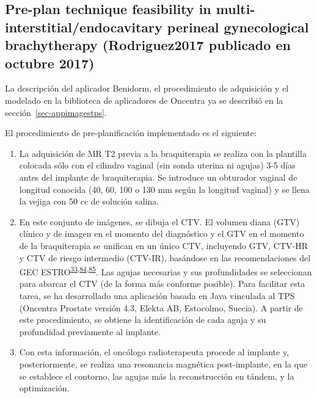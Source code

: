 \documentclass[
  a4paper,
]{scrreprt}
\begin{document}
\hypertarget{pre-plan-technique-feasibility-in-multi-interstitialendocavitary-perineal-gynecological-brachytherapy-rodriguez2017-publicado-en-octubre-2017}{%
\subsection{Pre-plan technique feasibility in
multi-interstitial/endocavitary perineal gynecological brachytherapy
(Rodriguez2017 publicado en octubre
2017)}\label{pre-plan-technique-feasibility-in-multi-interstitialendocavitary-perineal-gynecological-brachytherapy-rodriguez2017-publicado-en-octubre-2017}}

La descripción del aplicador Benidorm, el procedimiento de adquisición y
el modelado en la biblioteca de aplicadores de Oncentra ya se describió
en la sección~\ref{sec-appimagestps}.

El procedimiento de pre-planificación implementado es el siguiente:

\begin{enumerate}
\def\labelenumi{\arabic{enumi}.}
\item
  La adquisición de MR T2 previa a la braquiterapia se realiza con la
  plantilla colocada sólo con el cilindro vaginal (sin sonda uterina ni
  agujas) 3-5 días antes del implante de braquiterapia. Se introduce un
  obturador vaginal de longitud conocida (40, 60, 100 o 130 mm según la
  longitud vaginal) y se llena la vejiga con 50 cc de solución salina.
\item
  En este conjunto de imágenes, se dibuja el CTV. El volumen diana (GTV)
  clínico y de imagen en el momento del diagnóstico y el GTV en el
  momento de la braquiterapia se unifican en un único CTV, incluyendo
  GTV, CTV-HR y CTV de riesgo intermedio (CTV-IR), basándose en las
  recomendaciones del GEC
  ESTRO\textsuperscript{\protect\hyperlink{ref-viswanathan2007}{33},\protect\hyperlink{ref-gynecolo2011}{84},\protect\hyperlink{ref-yoshida2010}{85}}.
  Las agujas necesarias y sus profundidades se seleccionan para abarcar
  el CTV (de la forma más conforme posible). Para facilitar esta tarea,
  se ha desarrollado una aplicación basada en Java vinculada al TPS
  (Oncentra Prostate versión 4.3, Elekta AB, Estocolmo, Suecia). A
  partir de este procedimiento, se obtiene la identificación de cada
  aguja y su profundidad previamente al implante.
\item
  Con esta información, el oncólogo radioterapeuta procede al implante
  y, posteriormente, se realiza una resonancia magnética post-implante,
  en la que se establece el contorno, las agujas más la reconstrucción
  en tándem, y la optimización.
\end{enumerate}
\end{document}
